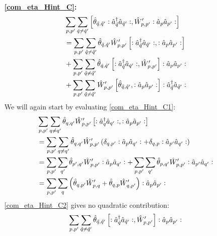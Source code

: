 \begin{appendix}
\begin{itemize}
\begin{align}
\end{align}
\item[\textbf{\ref{com_eta_Hint_C}:}]
\begin{subequations}
\begin{align}
& \sum\limits_{p, p^\prime}\sum\limits_{\tilde q\neq\tilde q^\prime} \left[\hat\theta_{\tilde q,\tilde q^\prime}\vcentcolon\hat a^\dagger_{\tilde q}\hat a_{\tilde q^\prime}\vcentcolon,\hat W_{p,p^\prime}^\prime\vcentcolon\hat a_p\hat a_{p^\prime}\vcentcolon\right] \nonumber\\
&=\sum\limits_{p, p^\prime}\sum\limits_{\tilde q\neq\tilde q^\prime} \hat\theta_{\tilde q,\tilde q^\prime}\hat W_{p,p^\prime}^\prime\left[\vcentcolon\hat a^\dagger_{\tilde q}\hat a_{\tilde q^\prime}\vcentcolon,\vcentcolon\hat a_p\hat a_{p^\prime}\vcentcolon\right]\label{com_eta_Hint_C1}\\
&+\sum\limits_{p, p^\prime}\sum\limits_{\tilde q\neq\tilde q^\prime}\hat\theta_{\tilde q,\tilde q^\prime}\left[\vcentcolon\hat a^\dagger_{\tilde q}\hat a_{\tilde q^\prime}\vcentcolon,\hat W_{p,p^\prime}^\prime\right]\vcentcolon\hat a_p\hat a_{p^\prime}\vcentcolon\label{com_eta_Hint_C2}\\
&+\sum\limits_{p, p^\prime}\sum\limits_{\tilde q\neq\tilde q^\prime}\hat W_{p,p^\prime}^\prime \left[\hat\theta_{\tilde q,\tilde q^\prime},\vcentcolon\hat a_p\hat a_{p^\prime}\vcentcolon\right]\vcentcolon\hat a^\dagger_{\tilde q}\hat a_{\tilde q^\prime}\vcentcolon\label{com_eta_Hint_C3}
\end{align}
\end{subequations}
We will again start by evaluating \ref{com_eta_Hint_C1}:
\begin{align}
&\sum\limits_{p, p^\prime}\sum\limits_{ q\neq q^\prime} \hat\theta_{ q, q^\prime}\hat W_{p,p^\prime}^\prime\left[\vcentcolon\hat a^\dagger_{ q}\hat a_{ q^\prime}\vcentcolon,\vcentcolon\hat a_p\hat a_{p^\prime}\vcentcolon\right]\nonumber\\
&=\sum\limits_{p, p^\prime}\sum\limits_{ q\neq q^\prime} \hat\theta_{ q, q^\prime}\hat W_{p,p^\prime}^\prime\left(\delta_{q,p^\prime}\vcentcolon\hat a_p\hat a_{q^\prime}\vcentcolon+\delta_{q,p}\vcentcolon\hat a_{p^\prime}\hat a_{q^\prime}\vcentcolon\right)\nonumber\\
&=\sum\limits_{p, p^\prime}\sum\limits_{q^\prime} \hat\theta_{ p^\prime, q^\prime}\hat W_{p,p^\prime}^\prime\vcentcolon\hat a_p\hat a_{q^\prime}\vcentcolon+\sum\limits_{p, p^\prime}\sum\limits_{q^\prime}\hat\theta_{ p, q^\prime}\hat W_{p,p^\prime}^\prime\vcentcolon\hat a_{p^\prime}\hat a_{q^\prime}\vcentcolon\nonumber\\
&=\sum\limits_{p, p^\prime}\sum\limits_{q}\left(\hat\theta_{ q, p^\prime}\hat W_{p,q}^\prime+\hat\theta_{ q, p}\hat W_{q,p^\prime}^\prime\right)\vcentcolon\hat a_{p}\hat a_{p^\prime}\vcentcolon
\end{align}
\ref{com_eta_Hint_C2} gives no quadratic contribution:
\begin{align}
&\Sum_{p, p^\prime}\Sum_{\tilde q\neq\tilde q^\prime}\hat\theta_{\tilde q,\tilde q^\prime}\left[\NO\CR_{\tilde q}\AN_{\tilde q^\prime}\NO,\hat W_{p,p^\prime}^\prime\right]\NO\AN_p\AN_{p^\prime}\NO\nonumber\\

\end{align}
\end{itemize}
\end{appendix}

